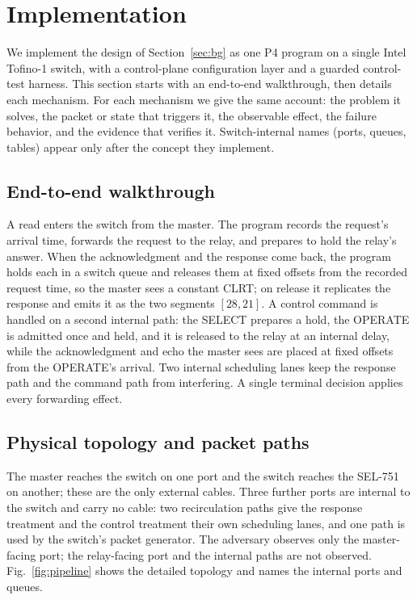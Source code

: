\section{Implementation}
\label{sec:impl}

We implement the design of Section~\ref{sec:bg} as one P4 program on a single Intel Tofino-1 switch,
with a control-plane configuration layer and a guarded control-test harness. This section starts with
an end-to-end walkthrough, then details each mechanism. For each mechanism we give the same account:
the problem it solves, the packet or state that triggers it, the observable effect, the failure
behavior, and the evidence that verifies it. Switch-internal names (ports, queues, tables) appear only
after the concept they implement.

\subsection{End-to-end walkthrough}
A read enters the switch from the master. The program records the request's arrival time, forwards the
request to the relay, and prepares to hold the relay's answer. When the acknowledgment and the
response come back, the program holds each in a switch queue and releases them at fixed offsets from
the recorded request time, so the master sees a constant CLRT; on release it replicates the response
and emits it as the two segments $[28,21]$. A control command is handled on a second internal path:
the SELECT prepares a hold, the OPERATE is admitted once and held, and it is released to the relay at
an internal delay, while the acknowledgment and echo the master sees are placed at fixed offsets from
the OPERATE's arrival. Two internal scheduling lanes keep the response path and the command path from
interfering. A single terminal decision applies every forwarding effect.

\subsection{Physical topology and packet paths}
The master reaches the switch on one port and the switch reaches the SEL-751 on another; these are the
only external cables. Three further ports are internal to the switch and carry no cable: two
recirculation paths give the response treatment and the control treatment their own scheduling lanes,
and one path is used by the switch's packet generator. The adversary observes only the master-facing
port; the relay-facing port and the internal paths are not observed. Fig.~\ref{fig:pipeline} shows the
detailed topology and names the internal ports and queues.

